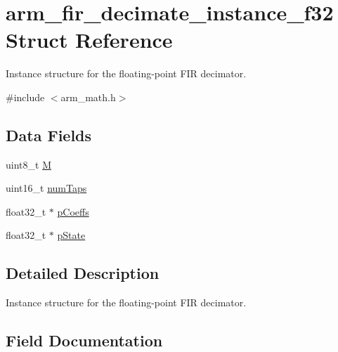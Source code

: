 \hypertarget{structarm__fir__decimate__instance__f32}{}\section{arm\+\_\+fir\+\_\+decimate\+\_\+instance\+\_\+f32 Struct Reference}
\label{structarm__fir__decimate__instance__f32}


Instance structure for the floating-\/point F\+IR decimator.  




{\ttfamily \#include $<$arm\+\_\+math.\+h$>$}

\subsection*{Data Fields}
\begin{DoxyCompactItemize}
\item 
uint8\+\_\+t \mbox{\hyperlink{structarm__fir__decimate__instance__f32_ae2c8107d00d3c9942e7a20fc598edecf}{M}}
\item 
uint16\+\_\+t \mbox{\hyperlink{structarm__fir__decimate__instance__f32_a751941891e47f522a7f5375fe8990aac}{num\+Taps}}
\item 
float32\+\_\+t $\ast$ \mbox{\hyperlink{structarm__fir__decimate__instance__f32_aacbb8dd8eeba4b21fc2bb40076405ee3}{p\+Coeffs}}
\item 
float32\+\_\+t $\ast$ \mbox{\hyperlink{structarm__fir__decimate__instance__f32_a335c87e6fdc4b96601d95a5de8b9c463}{p\+State}}
\end{DoxyCompactItemize}


\subsection{Detailed Description}
Instance structure for the floating-\/point F\+IR decimator. 

\subsection{Field Documentation}
\mbox{\label{structarm__fir__decimate__instance__f32_ae2c8107d00d3c9942e7a20fc598edecf}} 
